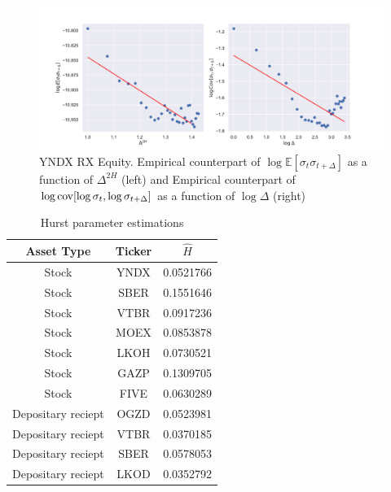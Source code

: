             \begin{frame}{}
                \begin{figure}
                    \includegraphics[width=\textwidth]{fig/YNDX RX Equity logE vs logD.pdf}
                    \caption{YNDX RX Equity. Empirical counterpart of $\log\mathbb{E} \left[\sigma_{t}\sigma_{t+\Delta}\right]$ as a function of $\Delta^{2H}$ (left) and Empirical counterpart of $\log\operatorname*{cov} [\log\sigma_{t}, \log\sigma_{t+\Delta}]$ as a function of $\log\Delta$ (right)}
                \end{figure}
            \end{frame}

            \begin{frame}{}
                \begin{table}[htbp]
                    \centering
                    \begin{tabular}{|c|c|c|}
                        \hline
                        Asset Type               & Ticker & $\hat H$  \\ \hline
                        \hline
                        Stock                    & YNDX   & 0.0521766 \\ \hline
                        Stock                    & SBER   & 0.1551646 \\ \hline
                        Stock                    & VTBR   & 0.0917236 \\ \hline
                        Stock                    & MOEX   & 0.0853878 \\ \hline
                        Stock                    & LKOH   & 0.0730521 \\ \hline
                        Stock                    & GAZP   & 0.1309705 \\ \hline
                        Stock                    & FIVE   & 0.0630289 \\ \hline
                        \hline
                        Depositary reciept       & OGZD   & 0.0523981 \\ \hline
                        Depositary reciept       & VTBR   & 0.0370185 \\ \hline
                        Depositary reciept       & SBER   & 0.0578053 \\ \hline
                        Depositary reciept       & LKOD   & 0.0352792 \\ \hline
                    \end{tabular}
                    \caption{Hurst parameter estimations}
                    \label{table:hurst_est}
                \end{table}
            \end{frame}

